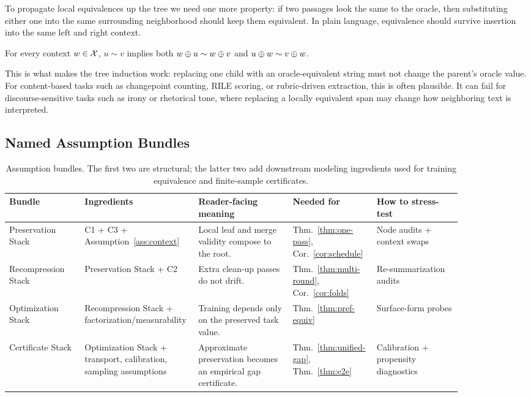 To propagate local equivalences up the tree we need one more property: if two passages look the same to the oracle, then substituting either one into the same surrounding neighborhood should keep them equivalent. In plain language, equivalence should survive insertion into the same left and right context.

\begin{assumption}\label{ass:context}
For every context $w \in \mathcal{X}$, $u \sim v$ implies both $w \oplus u \sim w \oplus v$ and $u \oplus w \sim v \oplus w$.
\end{assumption}

This is what makes the tree induction work: replacing one child with an oracle-equivalent string must not change the parent's oracle value. For content-based tasks such as changepoint counting, RILE scoring, or rubric-driven extraction, this is often plausible. It can fail for discourse-sensitive tasks such as irony or rhetorical tone, where replacing a locally equivalent span may change how neighboring text is interpreted.

\subsection{Named Assumption Bundles}

\begin{table}[htbp]
\centering\footnotesize
\setlength{\tabcolsep}{3pt}
\begin{tabular}{p{0.16\linewidth}p{0.18\linewidth}p{0.20\linewidth}p{0.14\linewidth}p{0.18\linewidth}}
\toprule
Bundle & Ingredients & Reader-facing meaning & Needed for & How to stress-test \\
\midrule
Preservation Stack & C1 + C3 + Assumption~\ref{ass:context} & Local leaf and merge validity compose to the root. & Thm.~\ref{thm:one-pass}, Cor.~\ref{cor:schedule} & Node audits + context swaps \\
Recompression Stack & Preservation Stack + C2 & Extra clean-up passes do not drift. & Thm.~\ref{thm:multi-round}, Cor.~\ref{cor:folds} & Re-summarization audits \\
Optimization Stack & Recompression Stack + factorization/measurability & Training depends only on the preserved task value. & Thm.~\ref{thm:pref-equiv} & Surface-form probes \\
Certificate Stack & Optimization Stack + transport, calibration, sampling assumptions & Approximate preservation becomes an empirical gap certificate. & Thm.~\ref{thm:unified-gap}, Thm.~\ref{thm:e2e} & Calibration + propensity diagnostics \\
\bottomrule
\end{tabular}
\caption{Assumption bundles. The first two are structural; the latter two add downstream modeling ingredients used for training equivalence and finite-sample certificates.}
\label{tab:assumption-bundles}
\end{table}

